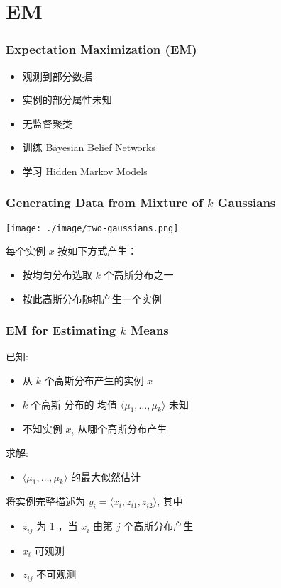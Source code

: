 \documentclass{beamer}
\begin{document}
\section{EM}
\label{sec-9}
\begin{frame}
\frametitle{Expectation Maximization (EM)}
\label{sec-9-1}

\begin{itemize}
\item 观测到部分数据
\item 实例的部分属性未知
\item 无监督聚类
\item 训练 Bayesian Belief Networks
\item 学习 Hidden Markov Models
\end{itemize}
\end{frame}
\begin{frame}
\frametitle{Generating Data from Mixture of $k$ Gaussians}
\label{sec-9-2}


\texttt{[image: ./image/two-gaussians.png]}


每个实例 $x$ 按如下方式产生：
\begin{itemize}
\item 按均匀分布选取 $k$ 个高斯分布之一
\item 按此高斯分布随机产生一个实例
\end{itemize}
\end{frame}
\begin{frame}
\frametitle{EM for Estimating $k$ Means}
\label{sec-9-3}


已知:
\begin{itemize}
\item 从 $k$ 个高斯分布产生的实例 $x$
\item $k$ 个高斯 分布的 均值 $\langle \mu_1, \ldots, \mu_k \rangle$ 未知
\item 不知实例 $x_i$ 从哪个高斯分布产生
\end{itemize}

求解:
\begin{itemize}
\item $\langle \mu_1, \ldots, \mu_k \rangle$ 的最大似然估计
\end{itemize}

将实例完整描述为 $y_i = \langle x_i, z_{i1}, z_{i2}\rangle$, 其中
\begin{itemize}
\item $z_{ij}$ 为 1 ，当 $x_i$ 由第 $j$ 个高斯分布产生
\item $x_i$ 可观测
\item $z_{ij}$ 不可观测
\end{itemize}
\end{frame}
\end{document}

